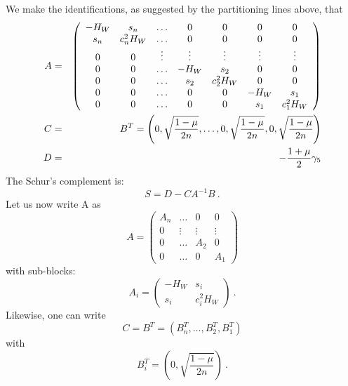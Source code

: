 \documentclass[12pt]{article}
\begin{document}
We make the identifications, as suggested by the partitioning lines above,  that 
\begin{eqnarray}
A &=&  
\left( \begin{array}{ccccccc} 
-H_W & s_n &       \ldots & 0 & 0 & 0& 0 \\
s_n  & c_n^2 H_W & \ldots & 0 & 0 & 0& 0 \\
 0   &   0       & \vdots & \vdots & \vdots & \vdots & \vdots \\
 0   &   0       & \ldots &  -H_W  &  s_2   &   0    &    0   \\
 0   &   0       & \ldots & s_2  & c_2^2 H_W &  0    &    0   \\
 0   &   0       & \ldots &    0   &    0    &  -H_W &  s_1   \\
 0   &   0       & \ldots &    0   &    0    &  s_1  & c_1^2 H_W
\end{array} \right) \\
 C &=& B^{T} = \left( 0, \sqrt{\frac{1-\mu}{2n}}, \ldots, 0, \sqrt{\frac{1-\mu}{2n}}, 0 , \sqrt{ \frac{1-\mu}{2n} } \right) \\
 D &=& -\frac{1+\mu}{2}\gamma_5 
\end{eqnarray}
The Schur's complement is: 
\begin{equation}
S = D - C A^{-1} B \ .
\end{equation}
Let us now write A as 
\begin{equation}
A = \left( \begin{array}{cccc}
A_{n} & \ldots &  0  & 0 \\
  0   & \vdots & \vdots& \vdots \\
  0   & \ldots & A_2   &  0 \\
  0   & \ldots &  0    &  A_1
\end{array} \right)
\end{equation}
with sub-blocks:
\begin{equation}
A_{i} = \left( \begin{array}{cc}
-H_W & s_{i} \\
s_{i}& c_i^2 H_W
\end{array} \right) \ .
\end{equation}
Likewise, one can write 
\begin{equation}
C = B^{T} = \left( B_{n}^T, \ldots, B_{2}^T, B_{1}^T \right)
\end{equation}
with 
\begin{equation}
B_{i}^T = \left( 0, \sqrt{ \frac{1 -\mu}{2n}} \right) \ .
\end{equation}
\end{document}
